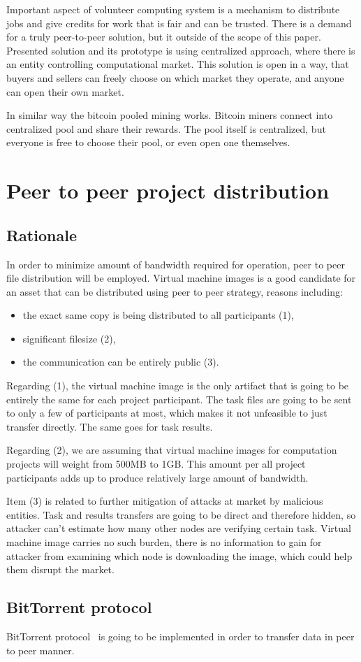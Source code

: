 Important aspect of volunteer computing system is a mechanism to distribute jobs and give credits for work that is fair and can be trusted. There is a demand for a truly peer-to-peer solution, but it outside of the scope of this paper. Presented solution and its prototype is using centralized approach, where there is an entity controlling computational market. This solution is open in a way, that buyers and sellers can freely choose on which market they operate, and anyone can open their own market.

In similar way the bitcoin pooled mining works. Bitcoin miners connect into centralized pool and share their rewards. The pool itself is centralized, but everyone is free to choose their pool, or even open one themselves.

\section{Peer to peer project distribution}
\label{sec:p2p_projects}

\subsection{Rationale}

In order to minimize amount of bandwidth required for operation, peer to peer file distribution will be employed. Virtual machine images is a good candidate for an asset that can be distributed using peer to peer strategy, reasons including:
\begin{itemize}
	\item the exact same copy is being distributed to all participants (1),
	\item significant filesize (2),
	\item the communication can be entirely public (3).
\end{itemize}

Regarding (1), the virtual machine image is the only artifact that is going to be entirely the same for each project participant. The task files are going to be sent to only a few of participants at most, which makes it not unfeasible to just transfer directly. The same goes for task results.

Regarding (2), we are assuming that virtual machine images for computation projects will weight from 500MB to 1GB. This amount per all project participants adds up to produce relatively large amount of bandwidth.

Item (3) is related to further mitigation of attacks at market by malicious entities. Task and results transfers are going to be direct and therefore hidden, so attacker can't estimate how many other nodes are verifying certain task. Virtual machine image carries no such burden, there is no information to gain for attacker from examining which node is downloading the image, which could help them disrupt the market.

\subsection{BitTorrent protocol}

BitTorrent protocol~\cite{cohen2008bittorrent} is going to be implemented in order to transfer data in peer to peer manner.
